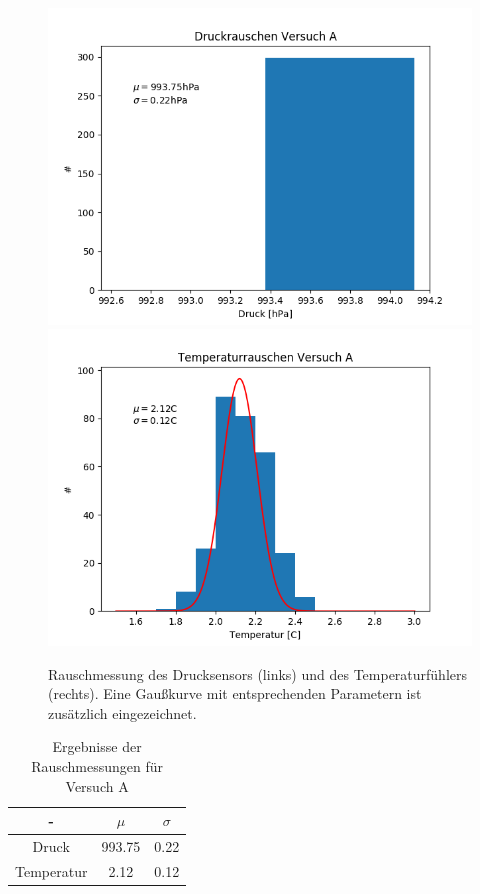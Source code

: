 \documentclass[12pt,a4paper]{article}
\begin{document}
\begin{figure}[H]
\includegraphics[scale=0.5]{Bilder/DruckrauschenA}
\includegraphics[scale=0.5]{Bilder/TemprauschenA}
\caption[Rauschen Versuch A]{Rauschmessung des Drucksensors (links) und des Temperaturfühlers (rechts). Eine Gaußkurve mit entsprechenden Parametern ist zusätzlich eingezeichnet.}
\label{fig:RauschenA}
\end{figure}

\begin{table}[H]
\begin{center}
\begin{tabular}{|c|c|c|}
\hline
- & $\mu$ & $\sigma$\\
\hline
Druck & 993.75 & 0.22\\
\hline
Temperatur & 2.12 & 0.12\\
\hline
\end{tabular}
\caption[Tab. Rauschen A]{Ergebnisse der Rauschmessungen für Versuch A}
\label{tab:RauschenA}
\end{center}
\end{table}
\end{document}
